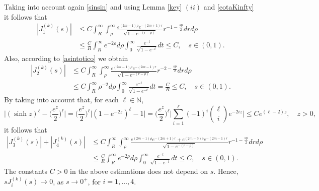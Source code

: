 \documentclass[a4paper,10pt, reqno]{amsart}
\theoremstyle{definition}
\theoremstyle{remark}
\numberwithin{equation}{section}
\begin{document}
{Taking into account again \eqref{sinsin} and using Lemma \ref{key} $(ii)$ and \eqref{cotaKinfty} it follows that
\begin{align*}
|J_1^{(k)}(s)|&\leq C\int_R^\infty \int_\rho ^\infty \frac{e^{(2m-1)\rho }e^{-(2m+1)r}}{\sqrt{1-e^{-(r-\rho )}}}r^{-1-\frac{sp}{2}}drd\rho\\
&\leq \frac{C}{R}\int_R^\infty e^{-2\rho }d\rho\int_0 ^\infty \frac{e^{-t}}{\sqrt{1-e^{-t}}}dt\leq C,\quad s\in (0,1).
\end{align*}
Also, according to \eqref{asintotico} we obtain
\begin{align*}
|J_2^{(k)}(s)|&\leq C\int_R^\infty \int_\rho ^\infty \frac{e^{(2m-1)\rho }e^{-(2m-1)r}}{\sqrt{1-e^{-(r-\rho )}}}r^{-2-\frac{sp}{2}}drd\rho\\
&\leq C\int_R^\infty \rho^{-2}d\rho\int_0 ^\infty \frac{e^{-t}}{\sqrt{1-e^{-t}}}dt=\frac{C}{R}\leq C,\quad s\in (0,1).
\end{align*}
By taking into account that, for each $\ell \in \mathbb N$,
$$
\Big|(\sinh z)^\ell -\Big(\frac{e^z}{2}\Big)^\ell \Big|=\Big(\frac{e^z}{2}\Big)^\ell \Big|(1-e^{-2z})^\ell -1\Big|=\Big(\frac{e^z}{2}\Big)^\ell\Big|\sum_{i=1}^\ell (-1)^{i}\binom{\ell }{i}e^{-2iz}\Big|\leq Ce^{(\ell -2)z},\quad z>0,
$$
it follows that
\begin{align*}
|J_3^{(k)}(s)|+|J_4^{(k)}(s)|&\leq C\int_R^\infty \int_\rho ^\infty \frac{e^{(2m-1)\rho }e^{-(2m+1)r}+e^{(2m-3)\rho }e^{-(2m-1)r}}{\sqrt{1-e^{-(r-\rho )}}}r^{-1-\frac{sp}{2}}drd\rho \\
&\leq \frac{C}{R}\int_R^\infty e^{-2\rho }d\rho \int_0 ^\infty \frac{e^{-t}}{\sqrt{1-e^{-t}}}dt\leq C,\quad s\in(0,1).
\end{align*}
The constants $C>0$ in the above estimations does not depend on $s$. Hence, $sJ_i^{(k)}(s)\longrightarrow 0$, as $s\rightarrow 0^+$, for $i=1,\ldots ,4$.

}
\end{document}
